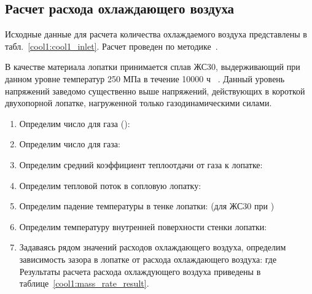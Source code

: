 \subsection{Расчет расхода охлаждающего воздуха}

Исходные данные для расчета количества охлаждаемого воздуха представлены в табл.~\ref{cool1:cool1_inlet}.
Расчет проведен по методике~\cite{ivanov}.

В качестве материала лопатки принимается сплав ЖС30, выдерживающий при данном уровне температур 250 МПа в течение 10000 ч ~\cite{js_36_properties}.
Данный уровень напряжений заведомо существенно выше напряжений, действующих в короткой двухопорной лопатке, нагруженной
только газодинамическими силами.

 \begin{enumerate}
 	\item Определим число для газа ():
 	\item Определим число для газа:
 	\item Определим средний коэффициент теплоотдачи от газа к лопатке:
 	\item Определим тепловой поток в сопловую лопатку:
 	\item Определим падение температуры в тенке лопатки:
 		(для ЖС30 при )
 	\item Определим температуру внутренней поверхности стенки лопатки:
 	\item Задаваясь рядом значений расходов охлаждающего воздуха, определим зависимость зазора в лопатке от расхода охлаждающего воздуха:
 		где 
 	Результаты расчета расхода охлаждующего воздуха приведены в таблице~\ref{cool1:mass_rate_result}.
		

 \end{enumerate}
